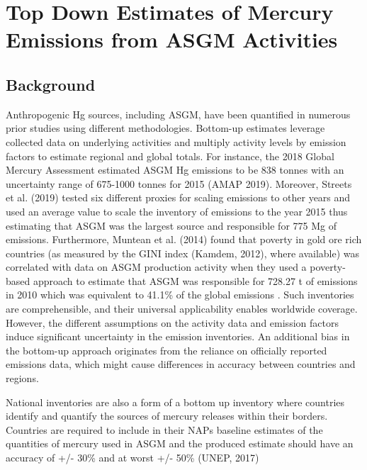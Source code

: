 \chapter{Top Down Estimates of Mercury Emissions from ASGM Activities}
\section{Background}
Anthropogenic Hg sources, including ASGM, have been quantified in numerous prior studies using different methodologies. Bottom-up estimates leverage collected data on underlying activities and multiply activity levels by emission factors to estimate regional and global totals. For instance, the 2018 Global Mercury Assessment estimated ASGM Hg emissions to be 838 tonnes with an uncertainty range of 675-1000 tonnes for 2015 (AMAP 2019). Moreover, Streets et al. (2019) tested six different proxies for scaling emissions to other years and used an average value to scale the inventory of emissions to the year 2015 thus estimating that ASGM was the largest source and responsible for 775 Mg of emissions. Furthermore, Muntean et al. (2014) found that poverty in  gold ore rich countries (as measured by the GINI index (Kamdem, 2012), where available) was correlated with data on ASGM production activity when they used a poverty-based approach to estimate that ASGM was responsible for 728.27 t of emissions in 2010 which was equivalent to 41.1\% of the global emissions . Such inventories are comprehensible, and their universal applicability enables worldwide coverage. However, the different assumptions on the activity data and emission factors induce significant uncertainty in the emission inventories. An additional bias in the bottom-up approach originates from the reliance on officially reported emissions data, which might cause differences in accuracy between countries and regions.

National inventories are also a form of a bottom up inventory where countries identify and quantify the sources of mercury releases within their borders. Countries are required to include in their NAPs baseline estimates of the quantities of mercury used in ASGM and the produced estimate should have an accuracy of +/- 30\% and at worst +/- 50\% (UNEP, 2017)


